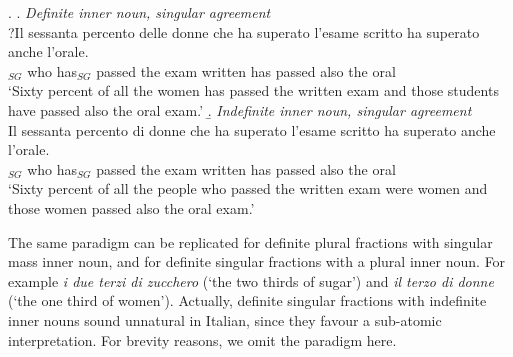 \documentclass[charis, linguex]{glossa}
\begin{document}
\ex. \a. \textit{Definite inner noun, singular agreement}	 \\    
   \gll ?Il sessanta percento delle donne che ha superato l'esame scritto ha superato anche l'orale. \\ 
      [the sixty percent {of the} women$_{PL}$]$_{SG}$ who has$_{SG}$ passed {the exam} written has passed also {the oral} \\
	  \glt `Sixty percent of all the women has passed the written exam and those students have passed also the oral exam.' \label{deglistudentisg} 
\b. \textit{Indefinite inner noun, singular agreement}	  \\  
\gll Il sessanta percento di donne che ha superato l'esame scritto ha superato anche l'orale. \\ 
      [the sixty percent of women$_{PL}$]$_{SG}$ who has$_{SG}$ passed {the exam} written has passed also {the oral} \\
	 \glt `Sixty percent of all the people who passed the written exam were women and those women passed also the oral exam.'\label{distudentisg}
	 

The same paradigm can be replicated for definite plural fractions with singular mass inner noun, and for definite singular fractions with a plural inner noun. For example \textit{i due terzi di zucchero} (`the two thirds of sugar') and \textit{il terzo di donne} (`the one third of women'). Actually, definite singular fractions with indefinite inner nouns sound unnatural in Italian, since they favour a sub-atomic interpretation. For brevity reasons, we omit the paradigm here. 
\end{document}
